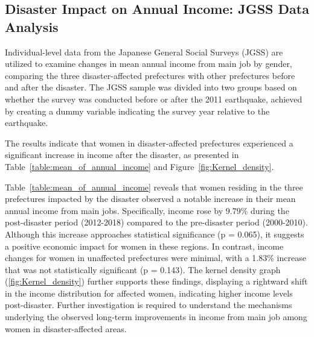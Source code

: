 \documentclass[a4paper,12pt]{article}
\begin{document}
\subsection{Disaster Impact on Annual Income: JGSS Data Analysis}

Individual-level data from the Japanese General Social Surveys (JGSS) are utilized to examine changes in mean annual income from main job by gender, comparing the three disaster-affected prefectures with other prefectures before and after the disaster. The JGSS sample was divided into two groups based on whether the survey was conducted before or after the 2011 earthquake, achieved by creating a dummy variable indicating the survey year relative to the earthquake.


\begin{table}[h]
\centering
\caption{Longitudinal Sample Size by Disaster Area Status and Survey Year, 2000-2018}
\label{tab:distribution}
\label{table:Longitudinal_sample}
\end{table}


The results indicate that women in disaster-affected prefectures experienced a significant increase in income after the disaster, as presented in Table~\ref{table:mean_of_annual_income} and Figure~\ref{fig:Kernel_density}.

Table~\ref{table:mean_of_annual_income} reveals that women residing in the three prefectures impacted by the disaster observed a notable increase in their mean annual income from main jobs. Specifically, income rose by 9.79\% during the post-disaster period (2012-2018) compared to the pre-disaster period (2000-2010). Although this increase approaches statistical significance (p = 0.065), it suggests a positive economic impact for women in these regions. In contrast, income changes for women in unaffected prefectures were minimal, with a 1.83\% increase that was not statistically significant (p = 0.143). The kernel density graph (\ref{fig:Kernel_density}) further supports these findings, displaying a rightward shift in the income distribution for affected women, indicating higher income levels post-disaster. Further investigation is required to understand the mechanisms underlying the observed long-term improvements in income from main job among women in disaster-affected areas.
\end{document}
